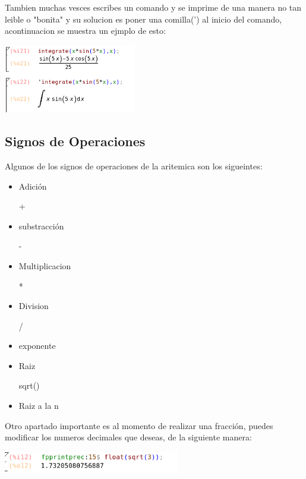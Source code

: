 \documentclass{article}
\begin{document}
Tambien muchas vesces escribes un comando y se imprime de una manera no tan leible o "bonita" y su solucion es poner una comilla(') al inicio del comando, acontinuacion se muestra un ejmplo de esto:


\begin{center}
\includegraphics[height=3cm]{fto4.png}
\end{center}

\subsection{Signos de Operaciones}

Algunos de los signos de operaciones de la aritemica son los sigueintes:

\begin{itemize}
\item Adición

+

\item substracción

-

\item Multiplicacion

*

\item Division

/

\item exponente


\item Raiz

 sqrt()
 
 
\item Raiz a la n




\end{itemize}


Otro apartado importante es al momento de realizar una fracción, puedes modificar los numeros decimales que deseas, de la siguiente manera:

\begin{center}
\includegraphics[height=1cm]{fto5.png}
\end{center}
\end{document}
